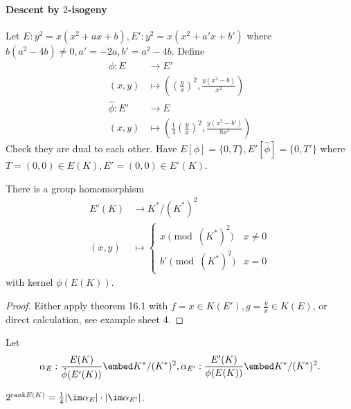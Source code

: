 \documentclass[a4paper]{article}
\theoremstyle{definition}
\theoremstyle{theorem}
\begin{document}
\paragraph{Descent by \(2\)-isogeny}

Let \(E: y^2 = x(x^2 + ax + b), E': y^2 = x(x^2 + a'x + b')\) where \(b(a^2 - 4b) \ne 0, a' = -2a, b' = a^2 - 4b\). Define
\begin{align*}
  \phi: E &\to E' \\
  (x, y) &\mapsto ((\frac{y}{x})^2, \frac{y(x^2 - b)}{x^2}) \\
  \hat \phi: E' &\to E \\
  (x, y) &\mapsto (\frac{1}{4} (\frac{y}{x})^2, \frac{y(x^2 - b')}{8x^2})
\end{align*}
Check they are dual to each other. Have \(E[\phi] = \{0, T\}, E'[\hat \phi] = \{0, T'\}\) where \(T = (0, 0) \in E(K), E' = (0, 0) \in E'(K)\).

\begin{proposition}
  There is a group homomorphism
  \begin{align*}
    E'(K) &\to K^*/(K^*)^2 \\
    (x, y) &\mapsto
             \begin{cases}
               x \pmod{(K^*)^2} & x \ne 0 \\
               b' \pmod{(K^*)^2} & x = 0
             \end{cases}
  \end{align*}
  with kernel \(\phi(E(K))\).
\end{proposition}

\begin{proof}
  Either apply theorem 16.1 with \(f = x \in K(E'), g = \frac{y}{x} \in K(E)\), or direct calculation, see example sheet 4.
\end{proof}

Let
\[
  \alpha_E: \frac{E(K)}{\hat \phi(E'(K))} \embed K^*/(K^*)^2, \alpha_{E'}: \frac{E'(K)}{\phi(E(K))} \embed K^*/(K^*)^2.
\]

\begin{lemma}
  \(2^{\mathrm{rank} E(K)} = \frac{1}{4} |\im \alpha_E| \cdot |\im \alpha_{E'}|\).
\end{lemma}
\end{document}
